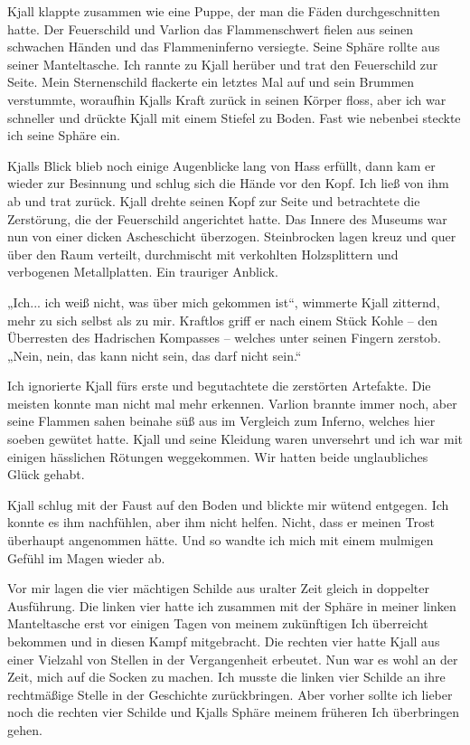Kjall klappte zusammen wie eine Puppe, der man die Fäden durchgeschnitten hatte. Der Feuerschild und Varlion das Flammenschwert fielen aus seinen schwachen Händen und das Flammeninferno versiegte. Seine Sphäre rollte aus seiner Manteltasche. Ich rannte zu Kjall herüber und trat den Feuerschild zur Seite. Mein Sternenschild flackerte ein letztes Mal auf und sein Brummen verstummte, woraufhin Kjalls Kraft zurück in seinen Körper floss, aber ich war schneller und drückte Kjall mit einem Stiefel zu Boden. Fast wie nebenbei steckte ich seine Sphäre ein.

Kjalls Blick blieb noch einige Augenblicke lang von Hass erfüllt, dann kam er wieder zur Besinnung und schlug sich die Hände vor den Kopf. Ich ließ von ihm ab und trat zurück. Kjall drehte seinen Kopf zur Seite und betrachtete die Zerstörung, die der Feuerschild angerichtet hatte. Das Innere des Museums war nun von einer dicken Ascheschicht überzogen. Steinbrocken lagen kreuz und quer über den Raum verteilt, durchmischt mit verkohlten Holzsplittern und verbogenen Metallplatten. Ein trauriger Anblick.

„Ich... ich weiß nicht, was über mich gekommen ist“, wimmerte Kjall zitternd, mehr zu sich selbst als zu mir. Kraftlos griff er nach einem Stück Kohle – den Überresten des Hadrischen Kompasses – welches unter seinen Fingern zerstob. „Nein, nein, das kann nicht sein, das darf nicht sein.“

Ich ignorierte Kjall fürs erste und begutachtete die zerstörten Artefakte. Die meisten konnte man nicht mal mehr erkennen. Varlion brannte immer noch, aber seine Flammen sahen beinahe süß aus im Vergleich zum Inferno, welches hier soeben gewütet hatte. Kjall und seine Kleidung waren unversehrt und ich war mit einigen hässlichen Rötungen weggekommen. Wir hatten beide unglaubliches Glück gehabt.

Kjall schlug mit der Faust auf den Boden und blickte mir wütend entgegen. Ich konnte es ihm nachfühlen, aber ihm nicht helfen. Nicht, dass er meinen Trost überhaupt angenommen hätte. Und so wandte ich mich mit einem mulmigen Gefühl im Magen wieder ab.

Vor mir lagen die vier mächtigen Schilde aus uralter Zeit gleich in doppelter Ausführung. Die linken vier hatte ich zusammen mit der Sphäre in meiner linken Manteltasche erst vor einigen Tagen von meinem zukünftigen Ich überreicht bekommen und in diesen Kampf mitgebracht. Die rechten vier hatte Kjall aus einer Vielzahl von Stellen in der Vergangenheit erbeutet. Nun war es wohl an der Zeit, mich auf die Socken zu machen. Ich musste die linken vier Schilde an ihre rechtmäßige Stelle in der Geschichte zurückbringen. Aber vorher sollte ich lieber noch die rechten vier Schilde und Kjalls Sphäre meinem früheren Ich überbringen gehen.

